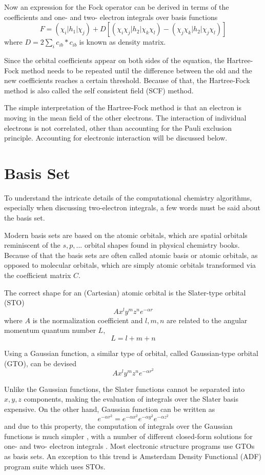\documentclass[12pt]{book} \usepackage[margin=1in]{geometry}
\begin{document}
Now an expression for the Fock operator can be derived in terms of the
coefficients and one- and two- electron integrals over basis functions
$$F = (\chi_i|h_1|\chi_j) +
      D [ (\chi_i \chi_j |h_2|\chi_k \chi_l) -
          (\chi_j \chi_k |h_2|\chi_j \chi_l) ]$$
where $D = 2 \sum_i c_{ib}*c_{ib}$ is known as density matrix.

Since the orbital coefficients appear on both sides of the equation,
the Hartree-Fock method needs to be repeated until the difference
between the old and the new coefficients reaches a certain threshold.
Because of that, the Hartree-Fock method is also called the self
consistent field (SCF) method.

The simple interpretation of the Hartree-Fock method is that an electron
is moving in the mean field of the other electrons.  The interaction of
individual electrons is not correlated, other than accounting for the
Pauli exclusion principle.  Accounting for electronic interaction will
be discussed below.

\section {Basis Set}
To understand the intricate details of the computational chemistry
algorithms, especially when discussing two-electron integrals, a few
words must be said about the basis set.

Modern basis sets are based on the atomic orbitals, which are
spatial orbitals reminiscent of the $s,p,...$ orbital shapes found in
physical chemistry books.  Because of that the basis sets are
often called atomic basis or atomic orbitals, as opposed to molecular
orbitals, which are simply atomic orbitals transformed via the
coefficient matrix $C$.

The correct shape for an (Cartesian) atomic orbital is the Slater-type
orbital (STO)
$$A x^l y^m z^n e^{-\alpha r}$$
where $A$ is the normalization coefficient and $l,m,n$ are related to
 the angular momentum quantum number $L$,
$$L = l + m + n$$

Using a Gaussian function, a similar type of orbital, called
Gaussian-type orbital (GTO), can be devised
$$A x^l y^m z^n e^{-\alpha r^2}$$

Unlike the Gaussian functions, the Slater functions cannot be
separated into $x,y,z$ components, making the evaluation of integrals
 over the Slater basis expensive.
On the other hand, Gaussian function can be written as
$$e^{-\alpha r^2} = e^{-\alpha x^2} e^{-\alpha y^2} e^{-\alpha z^2} $$
and due to this property, the computation of integrals over the
Gaussian functions is much simpler \cite{boys1950electronic}, with a
number of different closed-form solutions for one- and two- electron
integrals \cite{pople1978computation, rys_computation_1983,
  obara1986efficient, head1988method}.  Most electronic structure
programs use GTOs as basis sets.  An exception to this trend is
Amsterdam Density Functional (ADF) program suite \cite
{te2001chemistry} which uses STOs.
\end{document}
